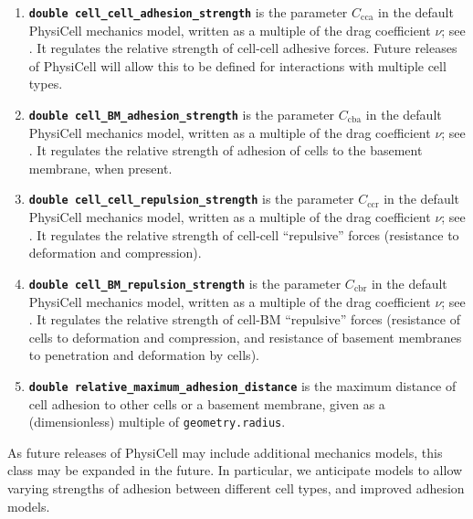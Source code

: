 \documentclass[12pt]{article}
\newcommand{\smallcode}[1]{\textbf{\texttt{#1}}}
\begin{document}
\begin{enumerate}
\item 
\smallcode{double cell\_cell\_adhesion\_strength} is the parameter 
$C_\textrm{cca}$ in the default 
PhysiCell mechanics model, written as a multiple of the drag coefficient $\nu$; see 
\cite{ref:PhysiCell}. It regulates the relative strength of cell-cell adhesive forces. Future releases of PhysiCell will allow this to be defined 
for interactions with multiple cell types. 

\item 
\smallcode{double cell\_BM\_adhesion\_strength} is the parameter $C_\textrm{cba}$ in the default 
PhysiCell mechanics model, written as a multiple of the drag coefficient $\nu$; see 
\cite{ref:PhysiCell}. It regulates the relative strength of adhesion of cells to the basement membrane, 
when present. 

\item 
\smallcode{double cell\_cell\_repulsion\_strength} is the parameter $C_\textrm{ccr}$ in the default 
PhysiCell mechanics model, written as a multiple of the drag coefficient $\nu$; see 
\cite{ref:PhysiCell}. It regulates the relative strength of cell-cell ``repulsive'' forces 
(resistance to deformation and compression). 

\item 
\smallcode{double cell\_BM\_repulsion\_strength} is the parameter $C_\textrm{cbr}$ in the default 
PhysiCell mechanics model, written as a multiple of the drag coefficient $\nu$; see 
\cite{ref:PhysiCell}. It regulates the relative strength of cell-BM ``repulsive'' forces 
(resistance of cells to deformation and compression, and resistance of basement membranes 
to penetration and deformation by cells). 

\item 
\smallcode{double relative\_maximum\_adhesion\_distance} is the maximum distance of cell adhesion 
to other cells or a basement membrane, given as a (dimensionless) multiple of \texttt{geometry.radius}. 

\end{enumerate}

As future releases of PhysiCell may include 
additional mechanics models, this class may be expanded in the future. In particular, 
we anticipate models to allow varying strengths of adhesion between different cell types, 
and improved adhesion models. 
\end{document}
